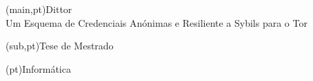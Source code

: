 
%




%
%
%
%
\nttitle(main,pt){Dittor\\Um Esquema de Credenciais Anónimas e Resiliente a Sybils para o Tor}%

\nttitle(sub,pt){Tese de Mestrado}%



%
%
%
%
\ntdepartment*(pt){Informática}   %



